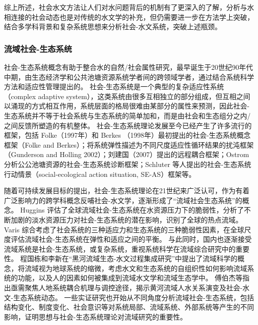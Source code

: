 综上所述，社会水文方法让人们对水问题背后的机制有了更深入的了解，分析与水相连接的社会动态也是对传统的水文学的补充，但仍需要进一步在方法学上突破，结合多学科背景和复杂系统思想来分析社会-水文系统，突破上述瓶颈。


\subsubsection*{流域社会-生态系统}

社会-生态系统概念有助于整合水的自然/社会属性研究\cite{fowler2022}，最早诞生于20世纪90年代中期，由生态经济学和公共池塘资源系统学者间的跨领域学者，通过结合系统科学方法和适应性管理提出的\cite{biggs2021}。
社会-生态系统是一个典型的复杂适应性系统（complex adaptive system），这类系统由很多互相独立的部分组成，但互相之间以涌现的方式相互作用，系统层面的格局很难由某部分的属性来预测，因此社会-生态系统并不等于社会系统与生态系统的简单加和，而是由社会和生态组分之内/之间反馈所塑造的有机整体。 %
社会-生态系统理论发展至今已经产生了许多流行的框架，包括 Folke（1997年）和 Berkes （1998年）最初提出的社会-生态系统概念框架（Folke and Berkes）；将系统弹性描述为不同尺度适应性循环结果的扰沌框架（Gunderson and Holling 2002）；刘建国（2007）提出的远程耦合框架；Ostrom 分析公公池塘资源的社会-生态系统诊断框架；Schluter 等人提出的社会-生态系统行动情景（social-ecological action situation, SE-AS）框架等。

随着可持续发展目标的提出，社会-生态系统理论在21世纪来广泛认可，作为有着广泛影响力的跨学科概念反哺社会-水文学，逐渐形成了“流域社会生态系统”的概念。
Huggins 评估了全球流域社会-生态系统在水资源压力下的脆弱性，分析了不断加剧的淡水资源压力对社会-生态系统的潜在影响，识别了全球的热点流域\cite{huggins2022}。
Varis 综合考虑了社会系统的三种适应力和生态系统的三种脆弱性因素，在全球尺度评估流域社会-生态系统在弹性和适应之间的平衡\cite{varis2019}。
与此同时，国内也逐渐接受流域系统是社会-生态系统，或复杂系统，重视系统科学在流域综合研究中的重要性。
程国栋和李新\cite{cheng2015}在“黑河流域生态-水文过程集成研究”中提出了流域科学的概念，将流域视为地球系统的缩微，考虑水文和生态系统的自组织性如何影响流域系统的功能，以及人的因素如何被集成到流域水文学和流域生态学中。
傅伯杰\cite{fu2017a}等指出亟需聚焦人地系统耦合机理与调控途径，揭示黄河流域人水关系演变及社会-水文-生态系统动态\cite{fu2021a}。
一些实证研究也开始从不同角度分析流域社会-生态系统，包括结构变化\cite{song2022}、制度变化\cite{wang2019d}、社会意识\cite{liu2023}等对系统局部、流域系统、外部系统等产生的不同影响，证明思想与社会-生态系统理论对流域研究的重要性。

